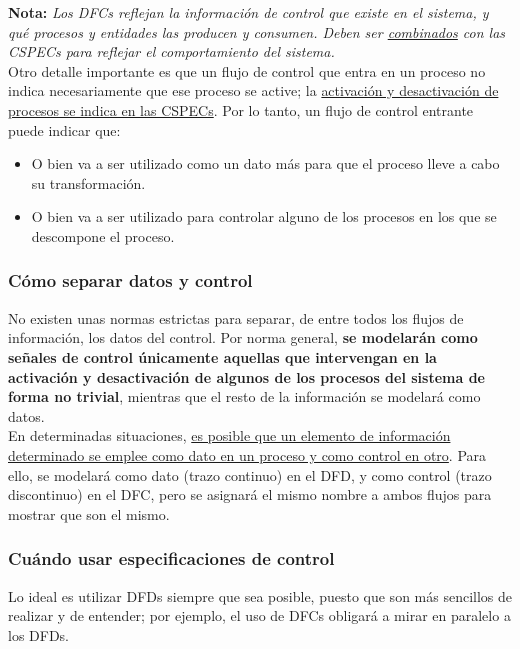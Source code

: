\textbf{Nota:} \textit{Los DFCs reflejan la información de control que existe en el sistema, y qué procesos y entidades las producen y consumen. Deben ser \uline{combinados} con las CSPECs para reflejar el comportamiento del sistema.}\\

Otro detalle importante es que un flujo de control que entra en un proceso no indica necesariamente que ese proceso se active; la \uline{activación y desactivación de procesos se indica en las CSPECs}. Por lo tanto, un flujo de control entrante puede indicar que:

\begin{itemize}
    \item O bien va a ser utilizado como un dato más para que el proceso lleve a cabo su transformación.
    \item O bien va a ser utilizado para controlar alguno de los procesos en los que se descompone el proceso.
\end{itemize}

\subsubsection{Cómo separar datos y control}

No existen unas normas estrictas para separar, de entre todos los flujos de información, los datos del control. Por norma general, \textbf{se modelarán como señales de control únicamente aquellas que intervengan en la activación y desactivación de algunos de los procesos del sistema de forma no trivial}, mientras que el resto de la información se modelará como datos.\\

En determinadas situaciones, \uline{es posible que un elemento de información determinado se emplee como dato en un proceso y como control en otro}. Para ello, se modelará como dato (trazo continuo) en el DFD, y como control (trazo discontinuo) en el DFC, pero se asignará el mismo nombre a ambos flujos para mostrar que son el mismo.

\subsubsection{Cuándo usar especificaciones de control}

Lo ideal es utilizar DFDs siempre que sea posible, puesto que son más sencillos de realizar y de entender; por ejemplo, el uso de DFCs obligará a mirar en paralelo a los DFDs.\\

